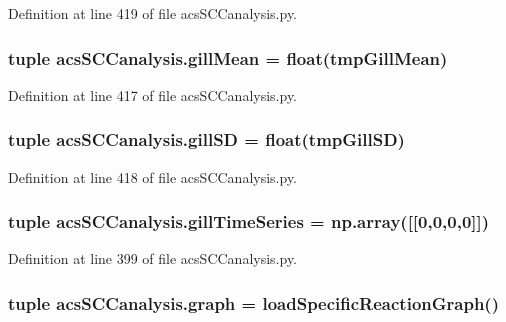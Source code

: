 Definition at line 419 of file acs\-S\-C\-Canalysis.\-py.

\hypertarget{a00096_a4e862896701636d17752f14810ff687f}{
\subsubsection[{gill\-Mean}]{\setlength{\rightskip}{0pt plus 5cm}tuple acs\-S\-C\-Canalysis.\-gill\-Mean = float(tmp\-Gill\-Mean)}}\label{a00096_a4e862896701636d17752f14810ff687f}


Definition at line 417 of file acs\-S\-C\-Canalysis.\-py.

\hypertarget{a00096_acdb3e72aea08c29494799fd08763b406}{
\subsubsection[{gill\-S\-D}]{\setlength{\rightskip}{0pt plus 5cm}tuple acs\-S\-C\-Canalysis.\-gill\-S\-D = float(tmp\-Gill\-S\-D)}}\label{a00096_acdb3e72aea08c29494799fd08763b406}


Definition at line 418 of file acs\-S\-C\-Canalysis.\-py.

\hypertarget{a00096_a99669fe823cebc560b46c3746f9183e7}{
\subsubsection[{gill\-Time\-Series}]{\setlength{\rightskip}{0pt plus 5cm}tuple acs\-S\-C\-Canalysis.\-gill\-Time\-Series = np.\-array(\mbox{[}\mbox{[}0,0,0,0\mbox{]}\mbox{]})}}\label{a00096_a99669fe823cebc560b46c3746f9183e7}


Definition at line 399 of file acs\-S\-C\-Canalysis.\-py.

\hypertarget{a00096_ab45392da38059bf7557c22cbc73e5580}{
\subsubsection[{graph}]{\setlength{\rightskip}{0pt plus 5cm}tuple acs\-S\-C\-Canalysis.\-graph = {\bf load\-Specific\-Reaction\-Graph}()}}\label{a00096_ab45392da38059bf7557c22cbc73e5580}


